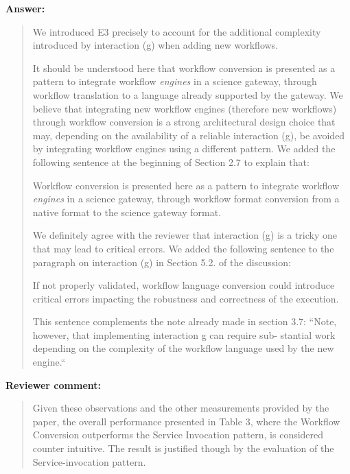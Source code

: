 \documentclass[a4]{article}
\newenvironment{review}%
{\textbf{Reviewer comment:}\begin{quote}}%
{\end{quote}}%
\newenvironment{answer}%
{\textbf{Answer:}\begin{small}\begin{quote}}%
{\end{quote}\end{small}}%
\newcommand{\revised}[1]{\color{blue} #1\color{black}\xspace}
\begin{document}
\begin{answer}
  We introduced E3 precisely to account for the additional
  complexity introduced by interaction (g) when adding new
  workflows. 
  
  It should be understood here that workflow conversion is
  presented as a pattern to integrate workflow \emph{engines} in a
  science gateway, through workflow translation to a language already
  supported by the gateway. We believe that integrating new workflow
  engines (therefore new workflows) through workflow conversion is a
  strong architectural design choice that may, depending on the
  availability of a reliable interaction (g), be avoided by
  integrating workflow engines using a different pattern. We added the following sentence at the beginning of Section 2.7 to explain that:
  
  \revised{Workflow conversion is presented here as a pattern to
integrate workflow \emph{engines} in a science gateway, through
workflow format conversion from a native format to the science gateway
format.}


We definitely agree with the reviewer that interaction (g) is
  a tricky one that may lead to critical errors. We added the
  following sentence to the paragraph on interaction (g) in Section
  5.2. of the discussion:

\revised{If not properly validated, workflow language conversion
  could introduce critical errors impacting the robustness and
  correctness of the execution. }

This sentence complements the note already made in section 3.7:
``Note, however,
that implementing interaction g can require sub-
stantial work depending on the complexity of the
workflow language used by the new engine.``
\end{answer}

\begin{review}
 Given these observations and the other measurements provided by the paper, the overall performance presented in Table 3, where the Workflow Conversion outperforms the Service Invocation pattern, is considered counter intuitive. The result is justified though by the evaluation of the Service-invocation pattern.
\end{review}
\end{document}
